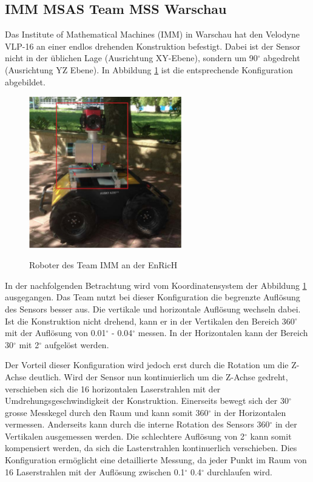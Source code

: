  \subsection{IMM MSAS Team MSS Warschau}
 \label{subsec:IMM}
Das Institute of Mathematical Machines (IMM) in Warschau hat den Velodyne VLP-16 an einer endlos drehenden Konstruktion befestigt. Dabei ist der Sensor nicht in der üblichen Lage (Ausrichtung XY-Ebene), sondern um 90$^\circ$ abgedreht (Ausrichtung YZ Ebene). In Abbildung \ref{fig:imm} ist die entsprechende Konfiguration abgebildet. 

   \begin{figure}[H]
	\centering
	\includegraphics[width=0.6\textwidth]
	{resources/IMM_cop.PNG}
	\caption[Roboter des Team IMM EnRicH]{Roboter des Team IMM an der EnRicH} \protect\cite{IMM}
	\label{fig:imm}
\end{figure}

In der nachfolgenden Betrachtung wird vom Koordinatensystem der Abbildung \ref{fig:imm} ausgegangen.
Das Team nutzt bei dieser Konfiguration die begrenzte Auflösung des Sensors besser aus. Die vertikale und horizontale Auflösung wechseln dabei. Ist die Konstruktion nicht drehend, kann er in der Vertikalen den Bereich 360$^\circ$ mit der Auflösung von 0.01$^\circ$ - 0.04$^\circ$ messen. In der Horizontalen kann der Bereich 30$^\circ$ mit 2$^\circ$ aufgelöst werden. 

Der Vorteil dieser Konfiguration wird jedoch erst durch die Rotation um die Z-Achse deutlich. Wird der Sensor nun kontinuierlich um die Z-Achse gedreht, verschieben sich die 16 horizontalen Laserstrahlen mit der Umdrehungsgeschwindigkeit der Konstruktion. Einerseits bewegt sich der 30$^\circ$ grosse Messkegel durch den Raum und kann somit 360$^\circ$ in der Horizontalen vermessen. Anderseits kann durch die interne Rotation des Sensors 360$^\circ$  in der Vertikalen ausgemessen werden. Die schlechtere Auflösung von 2$^\circ$ kann somit kompensiert werden, da sich die Lasterstrahlen kontinuerlich verschieben. Dies Konfiguration ermöglicht eine detaillierte Messung, da jeder Punkt im Raum von 16 Laserstrahlen mit der Auflösung zwischen 0.1$^\circ$ 0.4$^\circ$ durchlaufen wird. 

